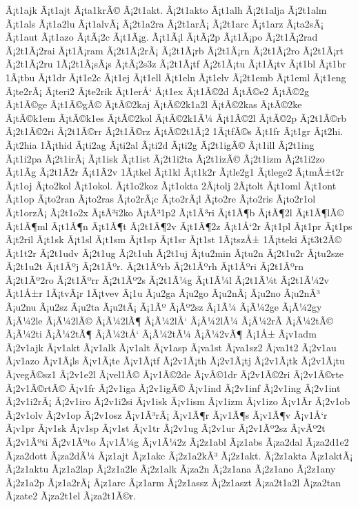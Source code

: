 {Ã¡t1ajk
Ã¡t1ajt
Ã¡ta1krÃ©
Ã¡2t1akt.
Ã¡2t1akto
Ã¡t1alh
Ã¡2t1alja
Ã¡2t1alm
Ã¡t1als
Ã¡t1a2lu
Ã¡t1alvÃ¡
Ã¡2t1a2ra
Ã¡2t1arÃ¡
Ã¡2t1arc
Ã¡t1arz
Ã¡ta2sÃ¡
Ã¡t1aut
Ã¡t1azo
Ã¡tÃ¡2c
Ã¡t1Ã¡g.
Ã¡t1Ã¡l
Ã¡tÃ¡2p
Ã¡t1Ã¡po
Ã¡2t1Ã¡2rad
Ã¡2t1Ã¡2rai
Ã¡t1Ã¡ram
Ã¡2t1Ã¡2rÃ¡
Ã¡2t1Ã¡rb
Ã¡2t1Ã¡rn
Ã¡2t1Ã¡2ro
Ã¡2t1Ã¡rt
Ã¡2t1Ã¡2ru
1Ã¡2t1Ã¡sÃ¡s
Ã¡tÃ¡2s3z
Ã¡2t1Ã¡tf
Ã¡2t1Ã¡tu
Ã¡t1Ã¡tv
Ã¡t1bl
Ã¡t1br
1Ã¡tbu
Ã¡t1dr
Ã¡t1e2c
Ã¡t1ej
Ã¡t1ell
Ã¡t1eln
Ã¡t1elv
Ã¡2t1emb
Ã¡t1eml
Ã¡t1eng
Ã¡te2rÃ¡
Ã¡teri2
Ã¡te2rik
Ã¡t1erÅ‘
Ã¡t1ex
Ã¡t1Ã©2d
Ã¡tÃ©e2
Ã¡tÃ©2g
Ã¡t1Ã©ge
Ã¡t1Ã©gÃ©
Ã¡tÃ©2kaj
Ã¡tÃ©2k1a2l
Ã¡tÃ©2kas
Ã¡tÃ©2ke
Ã¡tÃ©k1em
Ã¡tÃ©k1es
Ã¡tÃ©2kol
Ã¡tÃ©2k1Ã¼
Ã¡t1Ã©2l
Ã¡tÃ©2p
Ã¡2t1Ã©rb
Ã¡2t1Ã©2ri
Ã¡2t1Ã©rr
Ã¡2t1Ã©rz
Ã¡tÃ©2t1Ã¡2
1Ã¡tfÃ©s
Ã¡t1fr
Ã¡t1gr
Ã¡t2hi.
Ã¡t2hia
1Ã¡thid
Ã¡ti2ag
Ã¡ti2al
Ã¡ti2d
Ã¡ti2g
Ã¡2t1igÃ©
Ã¡t1ill
Ã¡2t1ing
Ã¡t1i2pa
Ã¡2t1irÃ¡
Ã¡t1isk
Ã¡t1ist
Ã¡2t1i2ta
Ã¡2t1izÃ©
Ã¡2t1izm
Ã¡2t1i2zo
Ã¡t1Ã­g
Ã¡2t1Ã­2r
Ã¡t1Ã­2v
1Ã¡tkel
Ã¡t1kl
Ã¡t1k2r
Ã¡tle2g1
Ã¡tlege2
Ã¡tmÅ±t2r
Ã¡t1oj
Ã¡to2kol
Ã¡t1okol.
Ã¡t1o2koz
Ã¡t1okta
2Ã¡tolj
2Ã¡tolt
Ã¡t1oml
Ã¡t1ont
Ã¡t1op
Ã¡to2ran
Ã¡to2ras
Ã¡to2rÃ¡c
Ã¡to2rÃ¡l
Ã¡to2re
Ã¡to2ris
Ã¡to2r1ol
Ã¡t1orzÃ¡
Ã¡2t1o2x
Ã¡tÃ³i2ko
Ã¡tÃ³1p2
Ã¡t1Ã³ri
Ã¡t1Ã¶b
Ã¡tÃ¶2l
Ã¡t1Ã¶lÃ©
Ã¡t1Ã¶ml
Ã¡t1Ã¶n
Ã¡t1Ã¶t
Ã¡2t1Ã¶2v
Ã¡t1Ã¶2z
Ã¡t1Å‘2r
Ã¡t1pl
Ã¡t1pr
Ã¡t1ps
Ã¡t2ril
Ã¡t1sk
Ã¡t1sl
Ã¡t1sm
Ã¡t1sp
Ã¡t1sr
Ã¡t1st
1Ã¡tszÅ±
1Ã¡tteki
Ã¡t3t2Ã©
Ã¡t1t2r
Ã¡2t1udv
Ã¡2t1ug
Ã¡2t1uh
Ã¡2t1uj
Ã¡tu2min
Ã¡tu2n
Ã¡2t1u2r
Ã¡tu2sze
Ã¡2t1u2t
Ã¡t1Ãºj
Ã¡2t1Ãºr.
Ã¡2t1Ãºrb
Ã¡2t1Ãºrh
Ã¡t1Ãºri
Ã¡2t1Ãºrn
Ã¡2t1Ãº2ro
Ã¡2t1Ãºrr
Ã¡2t1Ãº2s
Ã¡2t1Ã¼g
Ã¡t1Ã¼l
Ã¡2t1Ã¼t
Ã¡2t1Ã¼2v
Ã¡t1Å±r
1Ã¡tvÃ¡r
1Ã¡tvev
Ã¡1u
Ã¡u2ga
Ã¡u2go
Ã¡u2nÃ¡
Ã¡u2no
Ã¡u2nÃ³
Ã¡u2nu
Ã¡u2sz
Ã¡u2ta
Ã¡u2tÃ¡
Ã¡1Ãº
Ã¡Ãº2sz
Ã¡1Ã¼
Ã¡Ã¼2ge
Ã¡Ã¼2gy
Ã¡Ã¼2le
Ã¡Ã¼2lÃ©
Ã¡Ã¼2lÃ¶
Ã¡Ã¼2lÅ‘
Ã¡Ã¼2lÃ¼
Ã¡Ã¼2rÃ­
Ã¡Ã¼2tÃ©
Ã¡Ã¼2ti
Ã¡Ã¼2tÃ¶
Ã¡Ã¼2tÅ‘
Ã¡Ã¼2tÃ¼
Ã¡Ã¼2vÃ¶
Ã¡1Å±
Ã¡v1adm
Ã¡2v1ajk
Ã¡v1akt
Ã¡v1alk
Ã¡v1alt
Ã¡v1asp
Ã¡va1st
Ã¡va1sz2
Ã¡va1t2
Ã¡2v1au
Ã¡v1azo
Ã¡v1Ã¡ls
Ã¡v1Ã¡te
Ã¡v1Ã¡tf
Ã¡2v1Ã¡th
Ã¡2v1Ã¡tj
Ã¡2v1Ã¡tk
Ã¡2v1Ã¡tu
Ã¡vegÃ©sz1
Ã¡2v1e2l
Ã¡vel1Ã©
Ã¡v1Ã©2de
Ã¡vÃ©1dr
Ã¡2v1Ã©2ri
Ã¡2v1Ã©rte
Ã¡2v1Ã©rtÃ©
Ã¡v1fr
Ã¡2v1iga
Ã¡2v1igÃ©
Ã¡v1ind
Ã¡2v1inf
Ã¡2v1ing
Ã¡2v1int
Ã¡2v1i2rÃ¡
Ã¡2v1iro
Ã¡2v1i2si
Ã¡v1isk
Ã¡v1ism
Ã¡v1izm
Ã¡v1izo
Ã¡v1Ã­r
Ã¡2v1ob
Ã¡2v1olv
Ã¡2v1op
Ã¡2v1osz
Ã¡v1Ã³rÃ¡
Ã¡v1Ã¶r
Ã¡v1Ã¶s
Ã¡v1Ã¶v
Ã¡v1Å‘r
Ã¡v1pr
Ã¡v1sk
Ã¡v1sp
Ã¡v1st
Ã¡v1tr
Ã¡2v1ug
Ã¡2v1ur
Ã¡2v1Ãº2sz
Ã¡vÃº2t
Ã¡2v1Ãºti
Ã¡2v1Ãºto
Ã¡v1Ã¼g
Ã¡v1Ã¼2z
Ã¡2z1abl
Ã¡z1abs
Ã¡za2dal
Ã¡za2d1e2
Ã¡za2dott
Ã¡za2dÃ¼
Ã¡z1ajt
Ã¡z1akc
Ã¡2z1a2kÃ³
Ã¡2z1akt.
Ã¡2z1akta
Ã¡z1aktÃ¡
Ã¡2z1aktu
Ã¡z1a2lap
Ã¡2z1a2le
Ã¡2z1alk
Ã¡za2n
Ã¡2z1ana
Ã¡2z1ano
Ã¡2z1any
Ã¡2z1a2p
Ã¡z1a2rÃ¡
Ã¡z1arc
Ã¡z1arm
Ã¡2z1assz
Ã¡2z1aszt
Ã¡za2t1a2l
Ã¡za2tan
Ã¡zate2
Ã¡za2t1el
Ã¡za2t1Ã©r.
}
